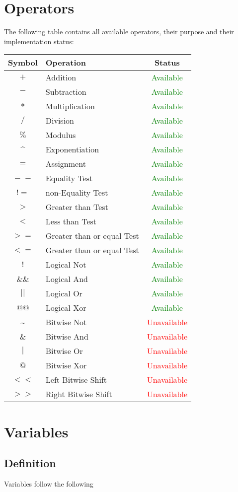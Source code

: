 \documentclass{standalone}
\begin{document}
	\section{Operators}
		The following table contains all available operators, their purpose and their implementation status:\\
		\begin{tabular}{| c | l | c |}
			\hline
			Symbol & Operation & Status\\
			\hline
			$+$ & Addition & \textcolor{green}{Available} \\
			\hline
			$-$ & Subtraction & \textcolor{green}{Available} \\
			\hline
			$*$ & Multiplication & \textcolor{green}{Available} \\
			\hline
			$/$ & Division & \textcolor{green}{Available} \\
			\hline
			$\%$ & Modulus & \textcolor{green}{Available} \\
			\hline
			\^{} & Exponentiation & \textcolor{green}{Available} \\
			\hline
			$=$ & Assignment & \textcolor{green}{Available} \\
			\hline
			$==$ & Equality Test & \textcolor{green}{Available} \\
			\hline
			$!=$ & non-Equality Test & \textcolor{green}{Available} \\
			\hline
			$>$ & Greater than Test & \textcolor{green}{Available} \\
			\hline
			$<$ & Less than Test & \textcolor{green}{Available} \\
			\hline
			$>=$ & Greater than or equal Test & \textcolor{green}{Available} \\
			\hline
			$<=$ & Greater than or equal Test & \textcolor{green}{Available} \\
			\hline
			$!$ & Logical Not & \textcolor{green}{Available} \\
			\hline
			$\&\&$ & Logical And & \textcolor{green}{Available} \\
			\hline
			$||$ & Logical Or & \textcolor{green}{Available} \\
			\hline
			$@@$ & Logical Xor & \textcolor{green}{Available} \\
			\hline
			\~{} & Bitwise Not & \textcolor{red}{Unavailable} \\
			\hline
			$\&$ & Bitwise And & \textcolor{red}{Unavailable} \\
			\hline
			$|$ & Bitwise Or & \textcolor{red}{Unavailable} \\
			\hline
			$@$ & Bitwise Xor & \textcolor{red}{Unavailable} \\
			\hline
			$<<$ & Left Bitwise Shift & \textcolor{red}{Unavailable} \\
			\hline
			$>>$ & Right Bitwise Shift & \textcolor{red}{Unavailable} \\
			\hline
		\end{tabular}

	\section{Variables}
		\subsection{Definition}
			Variables follow the following 
\end{document}
